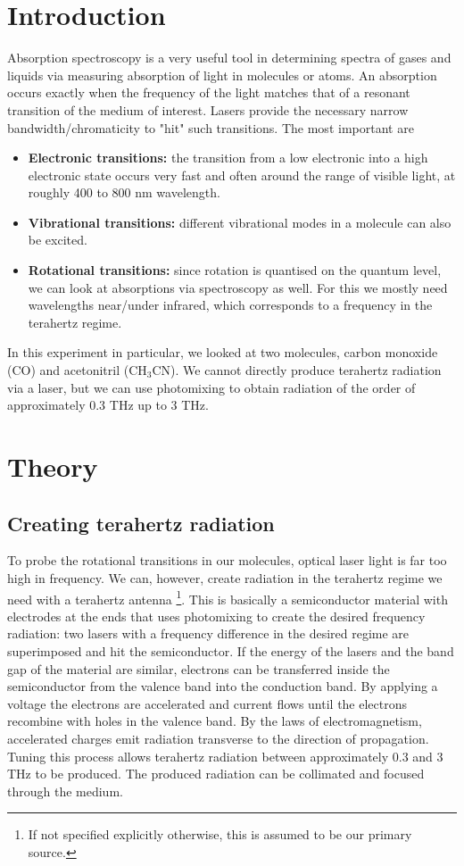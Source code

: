 \documentclass[a4paper,10pt]{scrartcl}
\begin{document}
\section{Introduction}
Absorption spectroscopy is a very useful tool in determining spectra of gases and liquids via measuring absorption of light in molecules or atoms. An absorption occurs exactly when the frequency of the light matches that of a resonant transition of the medium of interest. Lasers provide the necessary narrow bandwidth/chromaticity to "hit" such transitions. The most important are
\begin{itemize}
\item \textbf{Electronic transitions:} the transition from a low electronic into a high electronic state occurs very fast and often around the range of visible light, at roughly 400 to 800 nm wavelength.
\item \textbf{Vibrational transitions:} different vibrational modes in a molecule can also be excited.
\item \textbf{Rotational transitions:} since rotation is quantised on the quantum level, we can look at absorptions via spectroscopy as well. For this we mostly need wavelengths near/under infrared, which corresponds to a frequency in the terahertz regime.
\end{itemize}

In this experiment in particular, we looked at two molecules, carbon monoxide (CO) and acetonitril (CH$_3$CN). We cannot directly produce terahertz radiation via a laser, but we can use photomixing to obtain radiation of the order of approximately 0.3 THz up to 3 THz.

\section{Theory}

\subsection{Creating terahertz radiation}

To probe the rotational transitions in our molecules, optical laser light is far too high in frequency. We can, however, create radiation in the terahertz regime we need with a terahertz antenna \cite{fp2} \footnote{If not specified explicitly otherwise, this is assumed to be our primary source.}. This is basically a semiconductor material with electrodes at the ends that uses photomixing to create the desired frequency radiation: two lasers with a frequency difference in the desired regime are superimposed and hit the semiconductor. If the energy of the lasers and the band gap of the material are similar, electrons can be transferred inside the semiconductor from the valence band into the conduction band. By applying a voltage the electrons are accelerated and current flows until the electrons recombine with holes in the valence band. By the laws of electromagnetism, accelerated charges emit radiation transverse to the direction of propagation. Tuning this process allows terahertz radiation between approximately 0.3 and 3 THz to be produced. The produced radiation can be collimated and focused through the medium.
\end{document}
